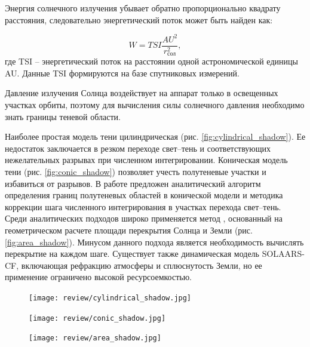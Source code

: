 Энергия солнечного излучения убывает обратно пропорционально квадрату расстояния, следовательно
энергетический поток может быть найден как:

\begin{equation*}
    W = TSI \frac{AU^2}{r^2_{\text{сол}}},
\end{equation*}
где TSI -- энергетический поток на расстоянии одной астрономической единицы AU.
Данные TSI формируются на базе спутниковых измерений.

Давление излучения Солнца воздействует на аппарат только в освещенных участках орбиты,
поэтому для вычисления силы солнечного давления необходимо знать границы теневой области.

Наиболее простая модель тени цилиндрическая (рис. \ref{fig:cylindrical_shadow}). Ее недостаток заключается в резком переходе
свет--тень и соответствующих нежелательных разрывах при численном интегрировании.
Коническая модель тени (рис. \ref{fig:conic_shadow}) позволяет учесть полутеневые участки и избавиться от разрывов.
В работе \cite{kuznetsov2024} предложен аналитический алгоритм определения границ полутеневых областей в конической модели
и методика коррекции шага численного интегрирования в участках перехода свет--тень. 
Среди аналитических подходов широко применяется метод \cite{zhang2019}, основанный на геометрическом
расчете площади перекрытия Солнца и Земли (рис. \ref{fig:area_shadow}). Минусом данного подхода является необходимость
вычислять перекрытие на каждом шаге. 
Существует также динамическая модель SOLAARS-CF, включающая рефракцию атмосферы и
сплюснутость Земли, но ее применение ограничено высокой ресурсоемкостью.

\begin{figure}[ht]
  \begin{minipage}[c]{0.68\textwidth}
    \centering
    \texttt{[image: review/cylindrical\_shadow.jpg]}
    \label{fig:cylindrical_shadow}
    
    \vspace{0.5cm} %
    
    \texttt{[image: review/conic\_shadow.jpg]}
    \label{fig:conic_shadow}
  \end{minipage}
  \hfill
  \begin{minipage}[c]{0.3\textwidth}
    \centering
    \texttt{[image: review/area\_shadow.jpg]}
    \label{fig:area_shadow}
  \end{minipage}

  \label{fig:combined}
\end{figure}

